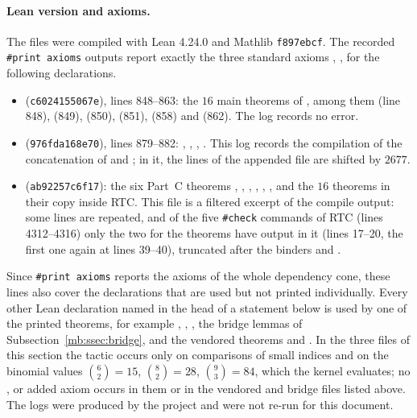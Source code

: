 \paragraph{Lean version and axioms.}
The files were compiled with Lean 4.24.0 and Mathlib \texttt{f897ebcf}. The recorded \texttt{\#print axioms} outputs
report exactly the three standard axioms , ,  for the following
declarations.
\begin{itemize}
\item {} (\texttt{c6024155067e}), lines 848--863: the $16$ main theorems of
  , among them  (line 848),  (849),  (850),
   (851),  (858) and  (862). The log
  records no error.
\item {} (\texttt{976fda168e70}), lines 879--882: ,
  , , . This log records the
  compilation of the concatenation of  and ; in it, the lines of the
  appended file are shifted by $2677$.
\item {} (\texttt{ab92257c6f17}): the six Part~C theorems ,
  , , ,
  , , and the $16$ 
  theorems in their copy inside RTC. This file is a filtered excerpt of the compile output: some lines are repeated,
  and of the five \texttt{\#check} commands of RTC (lines 4312--4316) only the two for the  theorems have
  output in it (lines 17--20, the first one again at lines 39--40), truncated after the binders  and
  .
\end{itemize}
Since \texttt{\#print axioms} reports the axioms of the whole dependency cone, these lines also cover the declarations
that are used but not printed individually. Every other Lean declaration named in the head of a statement below is
used by one of the printed theorems, for example , , , the
bridge lemmas of Subsection~\ref{mb:ssec:bridge}, and the vendored theorems  and . In
the three files of this section the tactic
 occurs only on comparisons of small indices and on the binomial values $\binom62=15$, $\binom82=28$,
$\binom93=84$, which the kernel evaluates; no ,  or added axiom occurs in them or in the
vendored and bridge files listed above. The logs were produced by the project and were not
re-run for this document.

